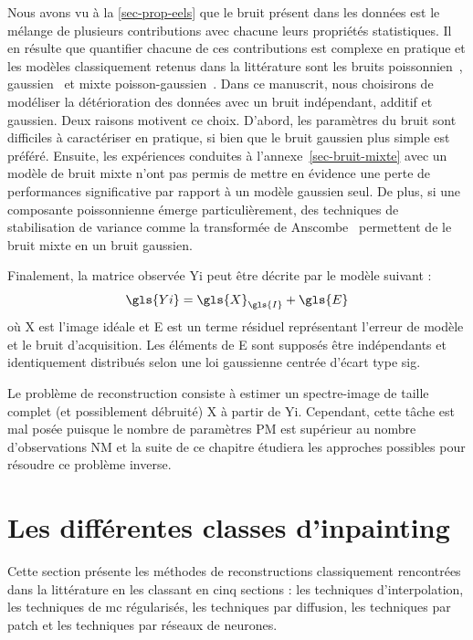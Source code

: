 Nous avons vu à la \cref{sec-prop-eels} que le bruit présent dans les données est le mélange de plusieurs contributions avec chacune leurs propriétés statistiques. Il en résulte que quantifier chacune de ces contributions est complexe en pratique et les modèles classiquement retenus dans la littérature sont les bruits poissonnien~\cite{egerton2011electron, mevenkamp2015poisson, stevens2018apl}, gaussien~\cite{stevens2014potential, binev2012compressed} et mixte poisson-gaussien~\cite{sanders2020inpainting}. Dans ce manuscrit, nous choisirons de modéliser la détérioration des données avec un bruit indépendant, additif et gaussien. Deux raisons motivent ce choix. D'abord, les paramètres du bruit sont difficiles à caractériser en pratique, si bien que le bruit gaussien plus simple est préféré. Ensuite, les expériences conduites à l'annexe~\ref{sec-bruit-mixte} avec un modèle de bruit mixte n'ont pas permis de mettre en évidence une perte de performances significative par rapport à un modèle gaussien seul. De plus, si une composante poissonnienne émerge particulièrement, des techniques de stabilisation de variance comme la transformée de Anscombe~\cite{anscombe1948transformation} permettent de  le bruit mixte en un bruit gaussien.

Finalement, la matrice observée \gls{Yi} peut être décrite par le modèle suivant :
\begin{equation}
    \gls{Yi} = \gls{X}_{\gls{I}} + \gls{E}
\end{equation}
où \gls{X} est l'image idéale et \gls{E} est un terme résiduel représentant l'erreur de modèle et le bruit d'acquisition. Les éléments de \gls{E} sont supposés être indépendants et identiquement distribués selon une loi gaussienne centrée d'écart type \gls{sig}.

Le problème de reconstruction consiste à estimer un spectre-image de taille  complet (et possiblement débruité) \gls{X} à partir de \gls{Yi}. Cependant, cette tâche est mal posée puisque le nombre de paramètres \gls{P}\gls{M} est supérieur au nombre d'observations \gls{N}\gls{M} et la suite de ce chapitre étudiera les approches possibles pour résoudre ce problème inverse.


%
\section{Les différentes classes d'inpainting}

Cette section présente les méthodes de reconstructions classiquement rencontrées dans la littérature en les classant en cinq sections : les techniques d'interpolation, les techniques de \gls{mc} régularisés, les techniques par diffusion, les techniques par patch et les techniques par réseaux de neurones.


